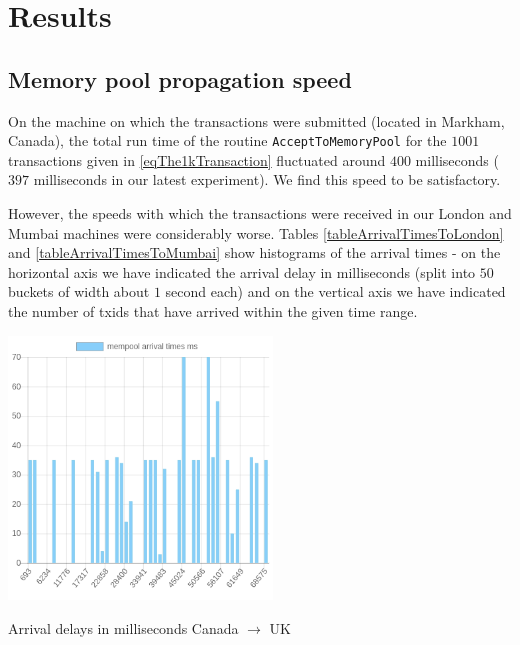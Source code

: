 \documentclass{article}
\begin{document}
\section{Results}
\subsection{Memory pool propagation speed}
On the machine on which the transactions were submitted (located in Markham, Canada), the total run time of the routine \verb|AcceptToMemoryPool| for the $1001$ transactions given in \eqref{eqThe1kTransaction} fluctuated around $400$ milliseconds ($397$ milliseconds in our latest experiment). We find this speed to be satisfactory.

However, the speeds with which the transactions were received in our London and Mumbai machines were considerably worse. Tables \ref{tableArrivalTimesToLondon} and \ref{tableArrivalTimesToMumbai} show histograms of the arrival times - on the horizontal axis we have indicated the arrival delay in milliseconds (split into $50$ buckets of width about $1$ second each) and on the vertical axis we have indicated the number of txids that have arrived within the given time range.
\begin{table}
	\begin{center}
	\includegraphics[width = 7cm]{./images/mempoolArrivalsLondon.png}
	\end{center}
	\caption{\label{tableArrivalTimesToLondon} Arrival delays in milliseconds Canada $ \to$ UK}
\end{table}
\end{document}
